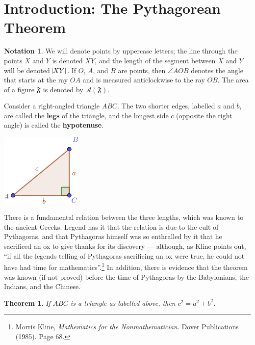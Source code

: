 \documentclass[a4paper,leqno]{article}
\numberwithin{equation}{section}
\newtheorem{thm}[equation]{Theorem}
\theoremstyle{definition}
\newtheorem{notation}[equation]{Notation}
\theoremstyle{remark}
\newcommand{\df}[1]{\textbf{#1}}
\begin{document}
\section{Introduction: The Pythagorean Theorem}
\begin{notation}
  We will denote points by uppercase letters; the line through the points $ X $ and $ Y $ is denoted $ XY $, and the length of the
  segment between $ X $ and $ Y $ will be denoted $ \abs{XY} $. If $ O $, $ A $, and $ B $ are points, then $ \angle AOB $ denotes
  the angle that starts at the ray $ OA $ and is measured anticlockwise to the ray $ OB $. The area of a figure $ \mathfrak{F} $ is
  denoted by $ \mathcal{A}(\mathfrak{F}) $.
\end{notation}

Consider a right-angled triangle $ ABC $. The two shorter edges, labelled $ a $ and $ b $, are called the \df{legs} of the triangle,
and the longest side $ c $ (opposite the right angle) is called the \df{hypotenuse}.

\begin{center}
  \includegraphics[width=0.3\textwidth]{pythag1}
\end{center}

There is a fundamental relation between the three lengths, which was known to the ancient Greeks. Legend has it that the relation
is due to the cult of Pythagoras, and that Pythagoras himself was so enthralled by it that he sacrificed an ox to give thanks for
its discovery --- although, as Kline points out, ``if all the legends telling of Pythagoras sacrificing an ox were true, he could
not have had time for mathematics''.\footnote{Morris Kline, \emph{Mathematics for the Nonmathematician}. Dover Publications (1985). Page 68.} In
addition, there is evidence that the theorem was known (if not proved) before the time of Pythagoras by the Babylonians, the Indians,
and the Chinese.

\begin{thm}
  If $ ABC $ is a triangle as labelled above, then $ c^2 = a^2 + b^2 $.
\end{thm}
\end{document}
